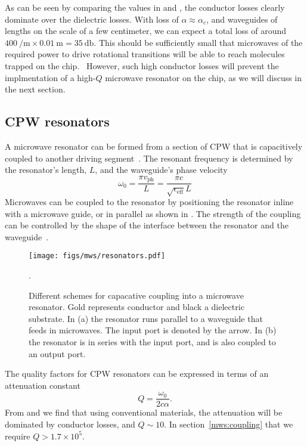 As can be seen by comparing the values in  and
, the conductor losses clearly dominate over
the dielectric losses.
%
With loss of $\alpha \approx \alpha_c$, and waveguides of lengths on
the scale of a few centimeter, we can expect a total loss of around
$\SI{400}{\per\metre} \times \SI{0.01}{\metre} = \SI{35}{\decibel}$. This
should be sufficiently small that microwaves of the required power to drive
rotational transitions will be able to reach molecules
trapped on the chip.~\cite{Treutlein2008}
%
However, such high conductor losses will prevent the implmentation of a
high-$Q$ microwave resonator on the chip, as we will discuss in the next
section.

\subsection{CPW resonators}
\label{mws:resonators}

A microwave resonator can be formed from a section of CPW that is capacitively
coupled to another driving segment~\cite{Day2003}. The resonant frequency is
determined by the resonator's length, $L$, and the waveguide's phase
velocity~\cite{Simons2004}
%
\begin{equation}
  \omega_0 = \frac{\pi v_\text{ph}}{L} = \frac{\pi
  c}{\sqrt{\epsilon_\text{eff}} L}
\end{equation}
%
Microwaves can be coupled to the resonator by positioning the resonator inline
with a microwave guide, or in parallel as shown in
. The strength of the coupling can be controlled by the shape of the
interface between the resonator and the waveguide~\cite{doi:10.1063/1.3010859}.

\begin{figure}
  \centering
  \texttt{[image: figs/mws/resonators.pdf]}
  \caption[Capacative coupling schemes for resonator]{
    Different schemes for capacative coupling into a microwave
    resonator. Gold represents conductor and black a dielectric substrate. In
    (a) the resonator runs parallel to a waveguide that feeds in microwaves.
    The input port is denoted by the arrow. In (b) the resonator is in series
    with the input port, and is also coupled to an output port.
  }
  \label{mws:fig:resonators}.
\end{figure}

The quality factors for CPW resonators can be expressed in terms of an
attenuation constant
%
\begin{equation}
  Q = \frac{\omega_0}{2c\alpha}.
  \label{mws:eqn:Qalpha}
\end{equation}
%
From  and  we
find that using conventional materials, the attenuation will be dominated
by conductor losses, and $Q\sim10$. In section~\ref{mws:coupling} that we
require $Q > 1.7 \times 10^5$.

